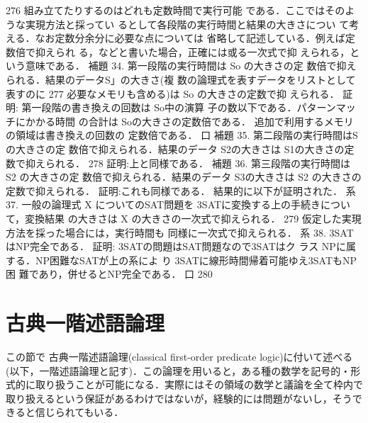 \documentclass{ltjsarticle}
\theoremstyle{mystyle1}
\theoremstyle{mystyle2}
\newcommand{\red}[1]{{\color{red} #1}}
\begin{document}
276
組み立てたりするのはどれも定数時間で実行可能 である．ここではそのような実現方法と採ってい るとして各段階の実行時間と結果の大きさについ て考える．なお定数分余分に必要な点については 省略して記述している．例えば定数倍で抑えられ る，などと書いた場合，正確には或る一次式で抑 えられる，という意味である．
補題 34. 第一段階の実行時間は So の大きさの定 数倍で抑えられる．結果のデータS」の大きさ(複 数の論理式を表すデータをリストとして表すのに
277
必要なメモリも含める)は So の大きさの定数で抑 えられる．
証明: 第一段階の書き換えの回数は So中の演算 子の数以下である．パターンマッチにかかる時間 の合計は Soの大きさの定数倍である． 追加で利用するメモリの領域は書き換えの回数の 定数倍である．
口
補題 35. 第二段階の実行時間はSの大きさの定 数倍で抑えられる．結果のデータ S2の大きさは S1の大きさの定数で抑えられる．
278
証明:上と同様である．
補題 36. 第三段階の実行時間は S2 の大きさの定 数倍で抑えられる．結果のデータ S3の大きさは S2 の大きさの定数で抑えられる．
証明:これも同様である．
結果的に以下が証明された．
系 37. 一般の論理式 X についてのSAT問題を 3SATに変換する上の手続きについて，変換結果 の大きさは X の大きさの一次式で抑えられる．
279
仮定した実現方法を採った場合には，実行時間も 同様に一次式で抑えられる．
系 38. 3SATはNP完全である．
証明: 3SATの問題はSAT問題なので3SATはク ラス NPに属する．NP困難なSATが上の系によ り 3SATに線形時間帰着可能ゆえ3SATもNP困 難であり，併せるとNP完全である．
口
280


\section{古典一階述語論理}
この節で\red{古典一階述語論理}(classical first-order predicate logic)に付いて述べる(以下，一階述語論理と記す)．この論理を用いると，ある種の数学を記号的・形式的に取り扱うことが可能になる．実際にはその領域の数学と議論を全て枠内で取り扱えるという保証があるわけではないが，経験的には問題がないし，そうできると信じられてもいる．
\end{document}
